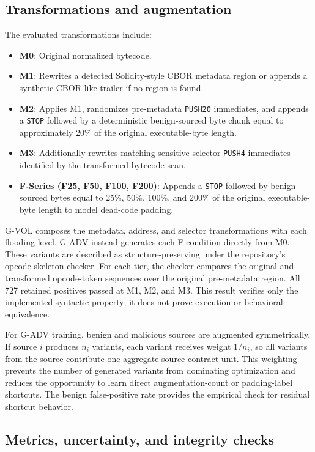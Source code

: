\documentclass[conference]{IEEEtran}
\begin{document}
\subsection{Transformations and augmentation}

The evaluated transformations include:
\begin{itemize}
  \item \textbf{M0}: Original normalized bytecode.
  \item \textbf{M1}: Rewrites a detected Solidity-style CBOR metadata region or appends a synthetic CBOR-like trailer if no region is found.
  \item \textbf{M2}: Applies M1, randomizes pre-metadata \texttt{PUSH20} immediates, and appends a \texttt{STOP} followed by a deterministic benign-sourced byte chunk equal to approximately 20\% of the original executable-byte length.
  \item \textbf{M3}: Additionally rewrites matching sensitive-selector \texttt{PUSH4} immediates identified by the transformed-bytecode scan.
  \item \textbf{F-Series (F25, F50, F100, F200)}: Appends a \texttt{STOP} followed by benign-sourced bytes equal to 25\%, 50\%, 100\%, and 200\% of the original executable-byte length to model dead-code padding.
\end{itemize}

G-VOL composes the metadata, address, and selector transformations with each flooding level. G-ADV instead generates each F condition directly from M0. These variants are described as structure-preserving under the repository's opcode-skeleton checker. For each tier, the checker compares the original and transformed opcode-token sequences over the original pre-metadata region. All 727 retained positives passed at M1, M2, and M3. This result verifies only the implemented syntactic property; it does not prove execution or behavioral equivalence.

For G-ADV training, benign and malicious sources are augmented symmetrically. If source $i$ produces $n_i$ variants, each variant receives weight $1/n_i$, so all variants from the source contribute one aggregate source-contract unit. This weighting prevents the number of generated variants from dominating optimization and reduces the opportunity to learn direct augmentation-count or padding-label shortcuts. The benign false-positive rate provides the empirical check for residual shortcut behavior.

\subsection{Metrics, uncertainty, and integrity checks}
\end{document}
